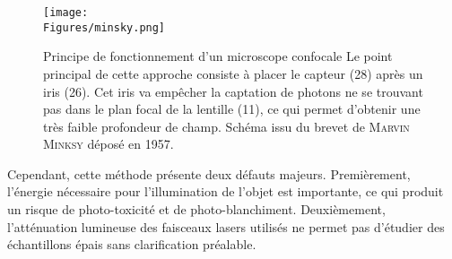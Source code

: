 \documentclass[\main/main.tex]{subfiles}
\begin{document}
\begin{figure}[h!]{\textwidth} 
    \centering
       \centering \texttt{[image: \\Figures/minsky.png]}
       \caption{
            \label{fig:confocal}
            Principe de fonctionnement d'un microscope confocale
            \newline
            Le point principal de cette approche consiste à placer le capteur (28) après un iris (26).
            Cet iris va empêcher la captation de photons ne se trouvant pas dans le plan focal de la lentille (11), ce qui permet d'obtenir une très faible profondeur de champ.
            \newline
            Schéma issu du brevet de \textsc{Marvin Minksy} déposé en 1957.
            }
\end{figure}

%
Cependant, cette méthode présente deux défauts majeurs.
%
Premièrement, l'énergie nécessaire pour l'illumination de l'objet est importante, ce qui produit un risque de photo\hyp{}toxicité et de photo\hyp{}blanchiment. Deuxièmement, l'atténuation lumineuse des faisceaux lasers utilisés ne permet pas d'étudier des échantillons épais sans clarification préalable.
\end{document}
